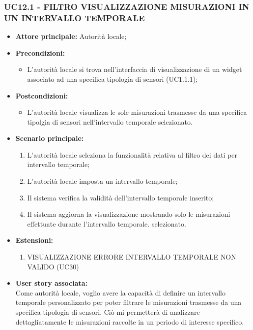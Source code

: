 \subsubsection{UC12.1 - FILTRO VISUALIZZAZIONE MISURAZIONI IN UN INTERVALLO TEMPORALE}
\begin{itemize}
    \item \textbf{Attore principale:} Autorità locale;
    \item \textbf{Precondizioni:}
        \begin{itemize}
            \item L'autorità locale si trova nell'interfaccia di visualizzazione di un widget associato ad una specifica tipologia di sensori (UC1.1.1); 
        \end{itemize}
    \item \textbf{Postcondizioni:}
        \begin{itemize}
            \item L'autorità locale visualizza le sole misurazioni trasmesse da una specifica tipolgia di sensori nell'intervallo temporale selezionato.
        \end{itemize}
    \item \textbf{Scenario principale:}
        \begin{enumerate}
            \item L'autorità locale seleziona la funzionalità relativa al filtro dei dati per intervallo temporale;
            \item L'autorità locale imposta un intervallo temporale;
            \item Il sistema verifica la validità dell'intervallo temporale inserito;
            \item Il sistema aggiorna la visualizzazione mostrando solo le misurazioni effettuate durante l'intervallo temporale. selezionato.
        \end{enumerate}
    \item \textbf{Estensioni:}
    \begin{enumerate}
        \item VISUALIZZAZIONE ERRORE INTERVALLO TEMPORALE NON VALIDO (UC30)
    \end{enumerate}
    \item \textbf{User story associata:} \\
        Come autorità locale, voglio avere la capacità di definire un intervallo temporale personalizzato per poter filtrare le misurazioni trasmesse da una specifica tipologia di sensori. Ciò mi permetterà di analizzare dettagliatamente le misurazioni raccolte in un periodo di interesse specifico.
\end{itemize}